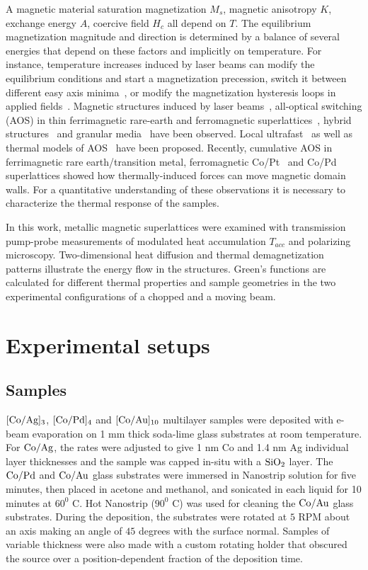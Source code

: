 \documentclass[5p]{elsarticle}
\begin{document}
A magnetic material saturation magnetization $M_{s}$, magnetic anisotropy $K$, exchange energy $A$, coercive field $H_{c}$ all depend on $T$. The equilibrium magnetization magnitude and direction is determined by a balance of several energies that depend on these factors and implicitly on temperature. For instance, temperature increases induced by laser beams can modify the equilibrium conditions and start a magnetization precession, switch it between different easy axis minima~\cite{2017deJong,2017Afanasiev}, or modify the magnetization hysteresis loops in applied fields~\cite{2007Stanciu}. Magnetic structures induced by laser beams~\cite{2006Aktag,2006Schuppler,2009Leufke,2014Kisielewski,2015Stark}, all-optical switching (AOS) in thin ferrimagnetic rare-earth and ferromagnetic superlattices~\cite{2014Lambert,2014Mangin}, hybrid structures~\cite{2017Gorchon} and granular media~\cite{2016Takahashi,2017John} have been observed. Local ultrafast~\cite{2007Stanciu,2016Cornelissen} as well as thermal models of AOS~\cite{2012Khorsand,2012Ostler,2016Xu,2016Ellis,2016Gorchon} have been proposed. Recently, cumulative AOS in ferrimagnetic rare earth/transition metal, ferromagnetic Co/Pt~\cite{2016Hadri} and Co/Pd~\cite{2017F} superlattices showed how thermally-induced forces can move magnetic domain walls. For a quantitative understanding of these observations it is necessary to characterize the thermal response of the samples.

In this work, metallic magnetic superlattices were examined with transmission pump-probe measurements of modulated heat accumulation $T_{acc}$ and polarizing microscopy. Two-dimensional heat diffusion and thermal demagnetization patterns illustrate the energy flow in the structures. Green's functions are calculated for different thermal properties and sample geometries in the two experimental configurations of a chopped and a moving beam.

\section{Experimental setups}

\subsection{Samples}

$\rm [Co/Ag]_{3}$, $\rm [Co/Pd]_{4}$ and $\rm [Co/Au]_{10}$ multilayer samples were deposited with e-beam evaporation on 1 mm thick soda-lime glass substrates at room temperature. For $\rm Co/Ag$, the rates were adjusted to give 1 nm Co and 1.4 nm Ag individual layer thicknesses and the sample was capped in-situ with a $\rm SiO_2$ layer. The $\rm Co/Pd$ and $\rm Co/Au$ glass substrates were immersed in Nanostrip solution for five minutes, then placed in acetone and methanol, and sonicated in each liquid for 10 minutes at $60^0$ C. Hot Nanostrip ($90^0$ C) was used for cleaning the $\rm Co/Au$ glass substrates. During the deposition, the substrates were rotated at $5$ RPM about an axis making an angle of $45$ degrees with the surface normal. Samples of variable thickness were also made with a custom rotating holder that obscured the source over a position-dependent fraction of the deposition time.
\end{document}
